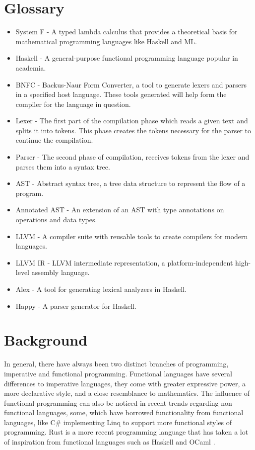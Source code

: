 \documentclass[12pt,a4paper]{article}
\begin{document}
\newpage

\section*{Glossary}
\begin{itemize}
    \item System F - A typed lambda calculus that provides a theoretical basis for mathematical programming languages like Haskell and ML.
    \item Haskell - A general-purpose functional programming language popular in academia.
    \item BNFC - Backus-Naur Form Converter, a tool to generate lexers and parsers in a specified host language. These tools generated will help form the compiler for the language in question. \cite{bnfc}
    \item Lexer - The first part of the compilation phase which reads a given text and splits it into tokens. This phase creates the tokens necessary for the parser to continue the compilation.
    \item Parser - The second phase of compilation, receives tokens from the lexer and parses them into a syntax tree.
    \item AST - Abstract syntax tree, a tree data structure to represent the flow of a program.
    \item Annotated AST - An extension of an AST with type annotations on operations and data types.
    \item LLVM - A compiler suite with reusable tools to create compilers for modern languages. \cite{llvm}
    \item LLVM IR - LLVM intermediate representation, a platform-independent high-level assembly language.
    \item Alex - A tool for generating lexical analyzers in Haskell.
    \item Happy - A parser generator for Haskell.
\end{itemize}

\newpage

\section{Background}
In general, there have always been two distinct branches of programming, imperative and functional programming.
Functional languages have several differences to imperative languages, they come with greater expressive power, a more
declarative style, and a close resemblance to mathematics. The influence of functional programming can also be noticed in
recent trends regarding non-functional languages, some, which have borrowed functionality from functional languages, like C\# implementing Linq
to support more functional styles of programming. Rust is a more recent programming language that has taken a
lot of inspiration from functional languages such as Haskell and OCaml \cite{rustinfl}.
\end{document}

